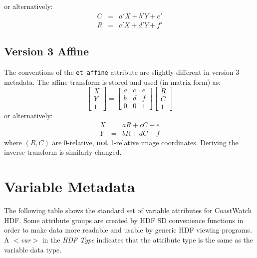 or alternatively:
\begin{eqnarray*}
  C & = & a' X + b' Y + e' \\
  R & = & c' X + d' Y + f'
\end{eqnarray*}

\subsection{Version 3 Affine}

The conventions of the {\tt et\_affine} attribute are slightly different
in version 3 metadata. The affine transform is stored and used (in
matrix form) as: 
\[
  \left[ \begin{array}{c}
           X \\
           Y \\
           1
         \end{array}  
  \right]
  = 
  \left[ \begin{array}{ccc}
           a & c & e \\
           b & d & f \\
           0 & 0 & 1
         \end{array}
  \right]
  \left[ \begin{array}{c}
           R \\
           C \\
           1
         \end{array}
  \right]
\]
or alternatively:
\begin{eqnarray*}
  X & = & a R + c C + e \\
  Y & = & b R + d C + f
\end{eqnarray*}
where $(R,C)$ are 0-relative, {\bf not} 1-relative image coordinates.
Deriving the inverse transform is similarly changed.

\section{Variable Metadata}

The following table shows the standard set of variable attributes for
CoastWatch HDF. Some attribute groups are created by HDF SD
convenience functions in order to make data more readable and usable
by generic HDF viewing programs. A {\it $<$var$>$} in the {\em HDF
Type} indicates that the attribute type is the same as the variable
data type.

